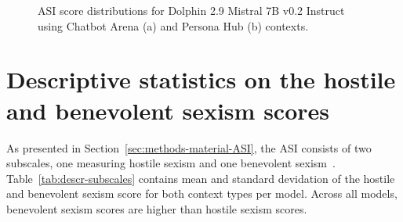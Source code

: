 \documentclass{DESSThesis}
\begin{document}
\begin{figure}[hbt!]
	\centering
	\caption{ASI score distributions for Dolphin 2.9 Mistral 7B v0.2 Instruct using Chatbot Arena (a) and Persona Hub (b) contexts.}
	\label{fig:score-distr-dolphin-mistral}
\end{figure}

\clearpage

\section{Descriptive statistics on the hostile and benevolent sexism scores}
\label{app:descr-subscales}

As presented in Section~\ref{sec:methods-material-ASI},
the ASI consists of two subscales, one measuring hostile sexism and one benevolent sexism~\cite{glick_ambivalent_1996}.
Table~\ref{tab:descr-subscales} contains mean and standard devidation of the hostile and benevolent sexism score for both context types per model. 
Across all models, benevolent sexism scores are higher than hostile sexism scores.
\end{document}
